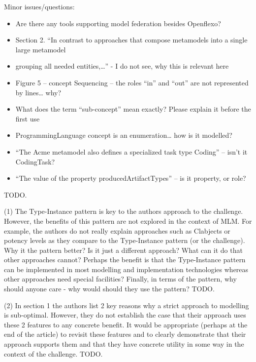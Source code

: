 \documentclass[10pt]{article}
\begin{document}
\begin{response}{Minor issues/questions:} 
\begin{itemize}
    \item Are there any tools supporting model federation besides Openflexo?
    \item Section 2. “In contrast to approaches that compose metamodels into a single large metamodel \item grouping all needed entities,…” - I do not see, why this is relevant here
    \item Figure 5 – concept Sequencing – the roles “in” and “out” are not represented by lines… why?
    \item What does the term “sub-concept” mean exactly? Please explain it before the first use
    \item ProgrammingLanguage concept is an enumeration… how is it modelled?
    \item “The Acme metamodel also defines a specialized task type Coding” – isn’t it CodingTask?
    \item “The value of the property producedArtifactTypes” – is it property, or role?

\end{itemize}
TODO. 
\end{response}


\pagebreak


\begin{response}{(1) The Type-Instance pattern is key to the authors approach to the challenge. However, the benefits of this pattern are not explored in the context of MLM. For example, the authors do not really explain approaches such as Clabjects or potency levels as they compare to the Type-Instance pattern (or the challenge). Why it the pattern better? Is it just a different approach? What can it do that other approaches cannot? Perhaps the benefit is that the Type-Instance pattern can be implemented in most modelling and implementation technologies whereas other approaches need special facilities? Finally, in terms of the pattern, why should anyone care - why would should they use the pattern?} 
TODO.
\end{response}

\begin{response}{(2) In section 1 the authors list 2 key reasons why a strict approach to modelling is sub-optimal. However, they do not establish the case that their approach uses these 2 features to any concrete benefit. It would be appropriate (perhaps at the end of the article) to revisit these features and to clearly demonstrate that their approach supports them and that they have concrete utility in some way in the context of the challenge.} 
TODO.
\end{response}
\end{document}
